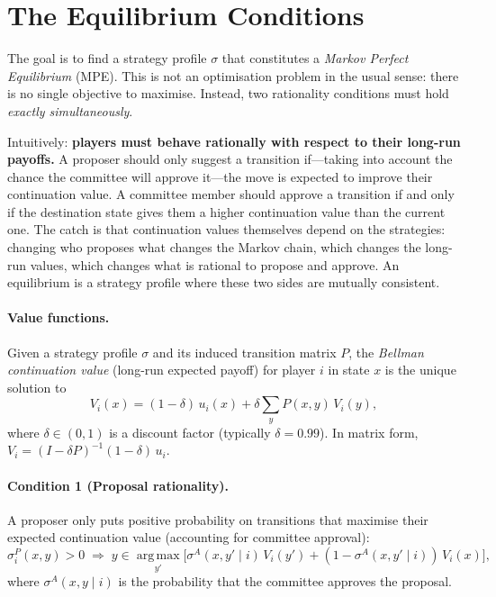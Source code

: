 \documentclass[11pt]{article}
\begin{document}
\section{The Equilibrium Conditions}

The goal is to find a strategy profile $\sigma$ that constitutes a \emph{Markov Perfect
Equilibrium} (MPE). This is not an optimisation problem in the usual sense: there is no single
objective to maximise. Instead, two rationality conditions must hold \emph{exactly
simultaneously}.

Intuitively: \textbf{players must behave rationally with respect to their long-run payoffs.} A
proposer should only suggest a transition if---taking into account the chance the committee will
approve it---the move is expected to improve their continuation value. A committee member should
approve a transition if and only if the destination state gives them a higher continuation value
than the current one. The catch is that continuation values themselves depend on the strategies:
changing who proposes what changes the Markov chain, which changes the long-run values, which
changes what is rational to propose and approve. An equilibrium is a strategy profile where these
two sides are mutually consistent.

\paragraph{Value functions.} Given a strategy profile $\sigma$ and its induced transition matrix
$P$, the \emph{Bellman continuation value} (long-run expected payoff) for player $i$ in state $x$
is the unique solution to
\begin{equation}
  V_i(x) = (1-\delta)\,u_i(x) + \delta \sum_{y} P(x,y)\,V_i(y),
  \label{eq:bellman}
\end{equation}
where $\delta \in (0,1)$ is a discount factor (typically $\delta = 0.99$). In matrix form,
$V_i = (I - \delta P)^{-1}(1-\delta)\,u_i$.

\paragraph{Condition 1 (Proposal rationality).} A proposer only puts positive probability on
transitions that maximise their expected continuation value (accounting for committee approval):
\begin{equation}
  \sigma^P_i(x,y) > 0 \;\Longrightarrow\;
  y \in \operatorname*{arg\,max}_{y'} \bigl[
    \sigma^A(x, y' \mid i)\, V_i(y') +
    (1 - \sigma^A(x, y' \mid i))\, V_i(x)
  \bigr],
  \label{eq:proposal_cond}
\end{equation}
where $\sigma^A(x,y \mid i)$ is the probability that the committee approves the proposal.
\end{document}
